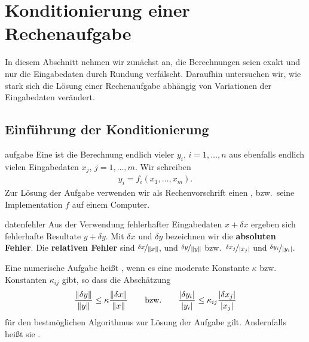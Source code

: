 \section{Konditionierung einer Rechenaufgabe}

\begin{intro}
  In diesem Abschnitt nehmen wir zunächst an, die Berechnungen seien
  exakt und nur die Eingabedaten durch Rundung verfälscht. Daraufhin
  untersuchen wir, wie stark sich die Lösung einer Rechenaufgabe
  abhängig von Variationen der Eingabedaten verändert.
\end{intro}

\subsection{Einführung der Konditionierung}

\begin{Definition}{aufgabe}
  Eine  ist die Berechnung endlich vieler
   $y_i$, $i=1,\dots,n$ aus ebenfalls endlich
  vielen Eingabedaten $x_j$, $j=1,\dots,m$. Wir schreiben
  \begin{gather}
    y_i = f_i(x_1,\dots,x_m).
  \end{gather}
  Zur Lösung der Aufgabe verwenden wir als Rechenvorschrift einen
  , bzw.\ seine Implementation $f$ auf einem Computer.
\end{Definition}

\begin{Definition}{datenfehler}
  Aus der Verwendung fehlerhafter Eingabedaten $x+\delta x$ ergeben
  sich fehlerhafte Resultate $y+\delta y$. Mit $\delta x$ und
  $\delta y$ bezeichnen wir die \textbf{absoluten
    Fehler}. Die
  \textbf{relativen Fehler} sind
  $\nicefrac{\delta x}{\lVert x\rVert}$, und $\nicefrac{\delta y}{\lVert y\rVert}$ bzw.\
  $\nicefrac{\delta x_j}{\lvert x_j\rvert}$ und $\nicefrac{\delta y_i}{\lvert y_i\rvert}$.

  Eine numerische Aufgabe heißt , wenn es
  eine moderate Konstante $\kappa$ bzw. Konstanten $\kappa_{ij}$ gibt, so dass die Abschätzung
  \begin{gather}
    \frac{\lVert\delta y\rVert}{\lVert y\rVert}
    \le \kappa \frac{\lVert\delta x\rVert}{\lVert x\rVert}
    \qquad\text{bzw.}\qquad
    \frac{\lvert\delta y_i\rvert}{\lvert y_i\rvert}
    \le \kappa_{ij} \frac{\lvert\delta x_j\rvert}{\lvert x_j\rvert}
  \end{gather}
  für den bestmöglichen Algorithmus zur Lösung der Aufgabe
  gilt. Andernfalls heißt sie .
\end{Definition}

